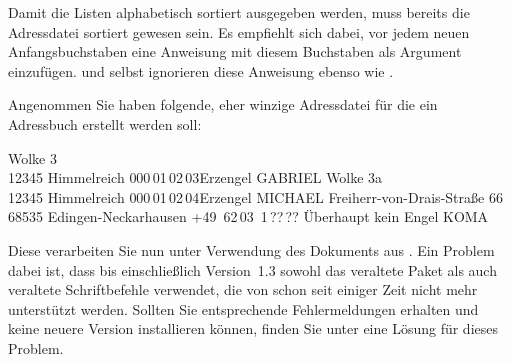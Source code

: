 Damit die Listen alphabetisch sortiert ausgegeben werden, muss bereits die
Adressdatei sortiert gewesen sein. Es empfiehlt sich dabei, vor jedem neuen
Anfangsbuchstaben eine Anweisung  mit diesem Buchstaben als
Argument einzufügen.  und  selbst
ignorieren diese Anweisung ebenso wie .
%
\begin{Example}
  Angenommen Sie haben folgende, eher winzige Adressdatei für die ein
  Adressbuch erstellt werden soll:
\begin{lstcode}
           {Wolke 3\\12345 Himmelreich}
           {000\,01\,02\,03}{}{}{Erzengel}
           {GABRIEL}
           {Wolke 3a\\12345 Himmelreich}
           {000\,01\,02\,04}{}{}{Erzengel}
           {MICHAEL}
           {Freiherr-von-Drais-Stra\ss e 66\\
             68535 Edingen-Neckarhausen}
           {+49~62\,03~1\,??\,??}{}{}
           {\"Uberhaupt kein Engel}
           {KOMA}
\end{lstcode}
  Diese verarbeiten Sie nun unter Verwendung des Dokuments 
  aus \cite{package:adrconv}. Ein Problem dabei ist, dass 
  bis einschließlich Version~1.3 sowohl das veraltete Paket 
  als auch veraltete Schriftbefehle verwendet, die von \KOMAScript{} schon
  seit einiger Zeit nicht mehr unterstützt werden. Sollten Sie entsprechende
  Fehlermeldungen erhalten und keine neuere Version installieren können,
  finden Sie unter \cite{https://komascript.de/node/2154} eine Lösung für
  dieses Problem.


\end{Example}
